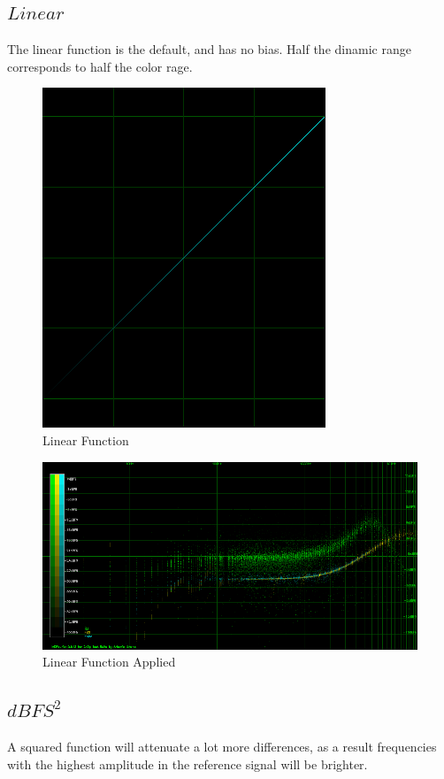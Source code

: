 \documentclass[10pt,a4paper]{report}
\begin{document}
\newpage
\subsection{$Linear$} 

The linear function is the default, and has no bias. Half the dinamic range corresponds to half the color rage.

\begin{figure}[H]
	\centering
	\includegraphics[width=0.4\linewidth]{plots/BetaFunctionPlot_3}
	\caption[Linear]{Linear Function}
	\label{fig:betafunctionplot3}
\end{figure}

\begin{figure}[H]
	\centering
	\includegraphics[width=1\linewidth]{plots/BetaFunctionPlot_3_Data}
	\caption[Linear Applied]{Linear Function Applied}
	\label{fig:betafunctionplot3data}
\end{figure}

\newpage
\subsection{$dBFS^2$}

A squared function will attenuate a lot more differences, as a result frequencies with the highest amplitude in the reference signal will be brighter.
\end{document}
